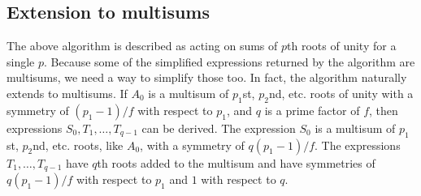 \documentclass{article}
\begin{document}
\subsection{Extension to multisums}
    The above algorithm is described as acting on sums of $ p $th roots of unity for a single $ p $. Because some of the simplified expressions returned by the algorithm are multisums, we need a way to simplify those too. In fact, the algorithm naturally extends to multisums. If $ A_0 $ is a multisum of $ p_1 $st, $ p_2 $nd, etc. roots of unity with a symmetry of $ (p_1 - 1)/f $ with respect to $ p_1 $, and $ q $ is a prime factor of $ f $, then expressions $ S_0, T_1, \dots, T_{q - 1} $ can be derived. The expression $ S_0 $ is a multisum of $ p_1 $st, $ p_2 $nd, etc. roots, like $ A_0 $, with a symmetry of $ q(p_1 - 1)/f $. The expressions $ T_1, \dots, T_{q - 1} $ have $ q $th roots added to the multisum and have symmetries of $ q(p_1 - 1)/f $ with respect to $ p_1 $ and $ 1 $ with respect to $ q $.\\
\end{document}
